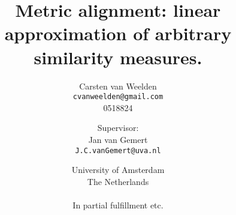 \documentclass[a4paper]{report}
\title{Metric alignment: linear approximation of arbitrary similarity measures.}
\author{Carsten van Weelden  \\ \texttt{cvanweelden@gmail.com} \\ 0518824 \and \small{Supervisor:} \\ Jan van Gemert \\ \texttt{J.C.vanGemert@uva.nl} \and University of Amsterdam\\
  The Netherlands \\ \\ In partial fulfillment etc.}
\begin{document}
\maketitle

\begin{abstract}

\end{abstract}

\tableofcontents



%
%














%

\end{document}
